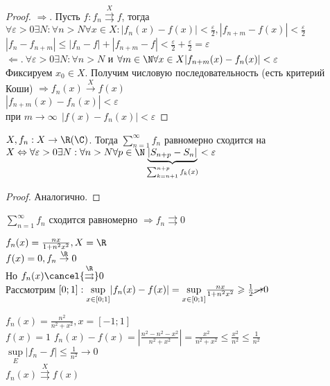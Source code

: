\begin{proof}
	$\Rightarrow.$ Пусть $f: f_n \overset{X}{\rightrightarrows} f$, тогда 
	$\forall \varepsilon > 0 \exists N: \forall n > N \forall x \in X: |f_n(x) - f(x)| < \frac{\varepsilon}{2}, 
	|f_{n+m} - f(x)| < \frac{\varepsilon}{2}$\\
	$|f_n - f_{n+m}| \leqslant |f_n - f| + |f_{n+m} - f| < \frac{\varepsilon}{2} + \frac{\varepsilon}{2} = \varepsilon$\\
	$\Leftarrow. \ \forall \varepsilon > 0 \exists N: \forall n > N$ и $\forall m \in \N \forall x \in X 
	|f_{n+m}(x) - f_n(x)| < \varepsilon$\\
	Фиксируем $x_0 \in X$. Получим числовую последовательность (есть критерий Коши) $\Rightarrow 
	f_n(x) \overset{X}{\to} f(x)$\\
	$|f_{n+m} (x) - f_n(x)|< \varepsilon$\\ при $m \to \infty \ \ |f(x) - f_n(x)| < \varepsilon$
\end{proof}

\begin{Thm}
	$X, f_n: X \to \R (\C)$. Тогда 
	$\sum_{n=1}^{\infty} f_n$ равномерно сходится на $X \Leftrightarrow \forall \varepsilon > 0 \exists N: \forall n > N
	\forall p \in \N \underbrace{|S_{n+p} - S_n|}_{\sum_{k=n+1}^{n+p} f_k(x)} < \varepsilon$
\end{Thm}

\begin{proof}
	Аналогично. 
\end{proof}

\begin{Cons}
	$\sum_{n=1}^{\infty} f_n$ сходится равномерно $\Rightarrow f_n \rightrightarrows 0$
\end{Cons}

\begin{Example}
	$f_n(x) = \frac{nx}{1 + n^2x^2}, X = \R$\\
	$f(x) = 0, f_n \overset{\R}{\to} 0$\\
	Но $f_n(x) \cancel{\overset{\R}{\rightrightarrows}} 0$\\
	Рассмотрим $[0;1]: \underset{x \in [0;1]}{\sup} |f_n(x) - f(x)| = 
	\underset{x \in [0;1]}{\sup} \frac{nx}{1+n^2x^2} \geqslant \frac{1}{2} \cancel{\to} 0$\\
\end{Example}

\begin{Example}
	$f_n(x) = \frac{n^2}{n^2 + x^2}, x = [-1; 1]$\\
	$f(x) = 1$
	$f_n(x) - f(x) = \left| \frac{n^2 - n^2 - x^2}{n^2 + x^2}  \right| = \frac{x^2}{n^2 + x^2} \leqslant
	\frac{x^2}{n^2} \leqslant \frac{1}{n^2}$\\
	$\underset{E}{\sup} |f_n - f| \leqslant \frac{1}{n^2} \to 0$\\
	$f_n(x) \overset{X}{\rightrightarrows} f(x)$
\end{Example}

